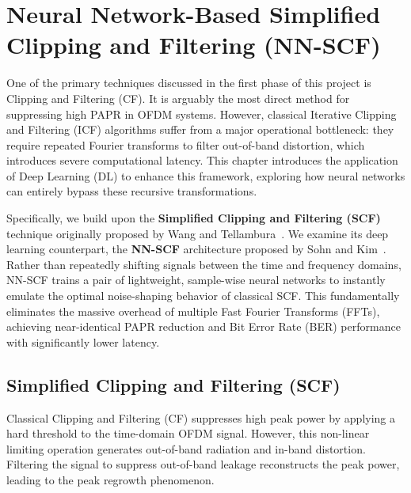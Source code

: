 \chapter{Neural Network-Based Simplified Clipping and Filtering (NN-SCF)}
\label{ch:nnscf}

One of the primary techniques discussed in the first phase of this project is Clipping and Filtering (CF). It is arguably the most direct method for suppressing high PAPR in OFDM systems. However, classical Iterative Clipping and Filtering (ICF) algorithms suffer from a major operational bottleneck: they require repeated Fourier transforms to filter out-of-band distortion, which introduces severe computational latency. This chapter introduces the application of Deep Learning (DL) to enhance this framework, exploring how neural networks can entirely bypass these recursive transformations.

Specifically, we build upon the \textbf{Simplified Clipping and Filtering (SCF)} technique originally proposed by Wang and Tellambura~\cite{wang2005simplified}. We examine its deep learning counterpart, the \textbf{NN-SCF} architecture proposed by Sohn and Kim~\cite{sohn2015neural}. Rather than repeatedly shifting signals between the time and frequency domains, NN-SCF trains a pair of lightweight, sample-wise neural networks to instantly emulate the optimal noise-shaping behavior of classical SCF. This fundamentally eliminates the massive overhead of multiple Fast Fourier Transforms (FFTs), achieving near-identical PAPR reduction and Bit Error Rate (BER) performance with significantly lower latency.

\section{Simplified Clipping and Filtering (SCF)}
\label{sec:scf_principles}

Classical Clipping and Filtering (CF) suppresses high peak power by applying a hard threshold to the time-domain OFDM signal. However, this non-linear limiting operation generates out-of-band radiation and in-band distortion. Filtering the signal to suppress out-of-band leakage reconstructs the peak power, leading to the peak regrowth phenomenon.

